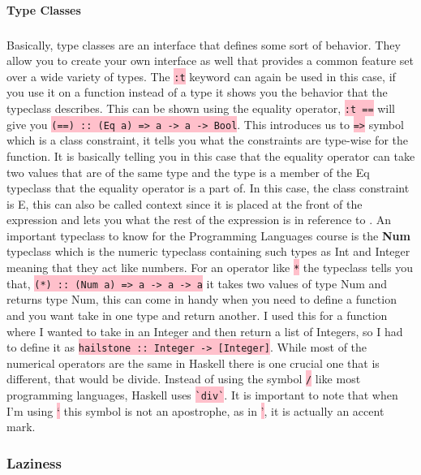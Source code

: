 \documentclass{article}
\begin{document}
\paragraph{Type Classes} 

\subparagraph{}

Basically, type classes are an interface that defines some sort of behavior. They allow you to create your own interface as well that provides a common feature set over a wide variety of types. The \colorbox{pink}{ \lstinline{:t}} keyword can again be used in this case, if you use it on a function instead of a type it shows you the behavior that the typeclass describes. This can be shown using the equality operator, \colorbox{pink}{ \lstinline{:t ==}} will give you \colorbox{pink}{ \lstinline{(==) :: (Eq a) => a -> a -> Bool}}. This introduces us to \colorbox{pink}{ \lstinline{=>}} symbol which is a class constraint, it tells you what the constraints are type-wise for the function. It is basically telling you in this case that the equality operator can take two values that are of the same type and the type is a member of the Eq typeclass that the equality operator is a part of. In this case, the class constraint is E, this can also be called context since it is placed at the front of the expression and lets you what the rest of the expression is in reference to \cite{TCO}. An important typeclass to know for the Programming Languages course is the \textbf{Num} typeclass which is the numeric typeclass containing such types as Int and Integer meaning that they act like numbers. For an operator like  \colorbox{pink}{ \lstinline{*}} the typeclass tells you that,  \colorbox{pink}{ \lstinline{(*) :: (Num a) => a -> a -> a}} it takes two values of type Num and returns type Num, this can come in handy when you need to define a function and you want take in one type and return another. I used this for a function where I wanted to take in an Integer and then return a list of Integers, so I had to define it as  \colorbox{pink}{ \lstinline{hailstone :: Integer -> [Integer]}}. While most of the numerical operators are the same in Haskell there is one crucial one that is different, that would be divide. Instead of using the symbol \colorbox{pink}{ \lstinline{/}} like most programming languages, Haskell uses \colorbox{pink}{ \lstinline{`div`}}. It is important to note that when I'm using \colorbox{pink}{ `} this symbol is not an apostrophe, as in  \colorbox{pink}{'}, it is actually an accent mark.

\subsubsection{Laziness}
\end{document}
